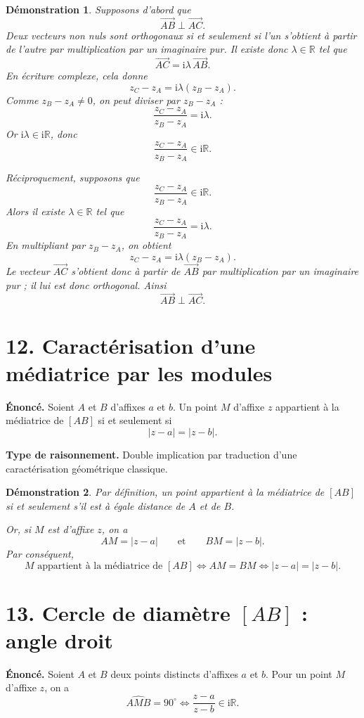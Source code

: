\documentclass[11pt,a4paper]{article}
\newtheorem{prop}{Démonstration}
\newcommand{\R}{\mathbb{R}}
\newcommand{\ii}{\mathrm{i}}
\begin{document}
\begin{prop}
Supposons d'abord que
\[
\overrightarrow{AB}\perp \overrightarrow{AC}.
\]
Deux vecteurs non nuls sont orthogonaux si et seulement si l'un s'obtient à partir de l'autre par multiplication par un imaginaire pur. Il existe donc $\lambda\in\R$ tel que
\[
\overrightarrow{AC}=\ii\lambda\,\overrightarrow{AB}.
\]
En écriture complexe, cela donne
\[
z_C-z_A=\ii\lambda(z_B-z_A).
\]
Comme $z_B-z_A\neq 0$, on peut diviser par $z_B-z_A$ :
\[
\frac{z_C-z_A}{z_B-z_A}=\ii\lambda.
\]
Or $\ii\lambda\in \ii\R$, donc
\[
\frac{z_C-z_A}{z_B-z_A}\in \ii\R.
\]

Réciproquement, supposons que
\[
\frac{z_C-z_A}{z_B-z_A}\in \ii\R.
\]
Alors il existe $\lambda\in\R$ tel que
\[
\frac{z_C-z_A}{z_B-z_A}=\ii\lambda.
\]
En multipliant par $z_B-z_A$, on obtient
\[
z_C-z_A=\ii\lambda(z_B-z_A).
\]
Le vecteur $\overrightarrow{AC}$ s'obtient donc à partir de $\overrightarrow{AB}$ par multiplication par un imaginaire pur ; il lui est donc orthogonal. Ainsi
\[
\overrightarrow{AB}\perp \overrightarrow{AC}.
\]
\end{prop}

\section*{12. Caractérisation d'une médiatrice par les modules}

\textbf{Énoncé.} Soient $A$ et $B$ d'affixes $a$ et $b$. Un point $M$ d'affixe $z$ appartient à la médiatrice de $[AB]$ si et seulement si
\[
|z-a|=|z-b|.
\]

\textbf{Type de raisonnement.} Double implication par traduction d'une caractérisation géométrique classique.

\begin{prop}
Par définition, un point appartient à la médiatrice de $[AB]$ si et seulement s'il est à égale distance de $A$ et de $B$.

Or, si $M$ est d'affixe $z$, on a
\[
AM=|z-a|
\qquad \text{et} \qquad
BM=|z-b|.
\]
Par conséquent,
\[
M \text{ appartient à la médiatrice de } [AB]
\iff
AM=BM
\iff
|z-a|=|z-b|.
\]
\end{prop}

\section*{13. Cercle de diamètre \texorpdfstring{$[AB]$}{[AB]} : angle droit}

\textbf{Énoncé.} Soient $A$ et $B$ deux points distincts d'affixes $a$ et $b$. Pour un point $M$ d'affixe $z$, on a
\[
\widehat{AMB}=90^\circ
\iff
\frac{z-a}{z-b}\in \ii\R.
\]
\end{document}
